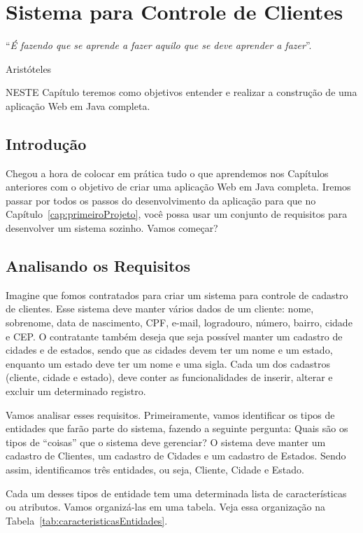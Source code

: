 \chapter{Sistema para Controle de Clientes}\label{cap:sistemaControleClientes}
\epigraph{``\textit{É fazendo que se aprende a fazer aquilo que se deve aprender a fazer}''.}{Aristóteles}

\lettrine[lines=4, lhang=0.1, lraise=0, loversize=0.2, findent=0.1em]{\textcolor{corTema}{N}}{ESTE} Capítulo teremos como objetivos entender e realizar a construção de uma aplicação Web em Java completa.


\section{Introdução}

Chegou a hora de colocar em prática tudo o que aprendemos nos Capítulos anteriores com o objetivo de criar uma aplicação Web em Java completa. Iremos passar por todos os passos do desenvolvimento da aplicação para que no Capítulo~\ref{cap:primeiroProjeto}, você possa usar um conjunto de requisitos para desenvolver um sistema sozinho. Vamos começar?


\section{Analisando os Requisitos}

Imagine que fomos contratados para criar um sistema para controle de cadastro de clientes. Esse sistema deve manter vários dados de um cliente: nome, sobrenome, data de nascimento, CPF, e-mail, logradouro, número, bairro, cidade e CEP. O contratante também deseja que seja possível manter um cadastro de cidades e de estados, sendo que as cidades devem ter um nome e um estado, enquanto um estado deve ter um nome e uma sigla. Cada um dos cadastros (cliente, cidade e estado), deve conter as funcionalidades de inserir, alterar e excluir um determinado registro.

Vamos analisar esses requisitos. Primeiramente, vamos identificar os tipos de entidades que farão parte do sistema, fazendo a seguinte pergunta: Quais são os tipos de ``coisas'' que o sistema deve gerenciar? O sistema deve manter um cadastro de Clientes, um cadastro de Cidades e um cadastro de Estados. Sendo assim, identificamos três entidades, ou seja, Cliente, Cidade e Estado.

Cada um desses tipos de entidade tem uma determinada lista de características ou atributos. Vamos organizá-las em uma tabela. Veja essa organização na Tabela~\ref{tab:caracteristicasEntidades}.

